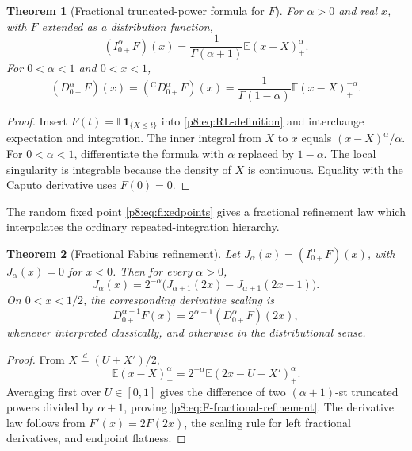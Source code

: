 \documentclass[11pt,oneside]{article}
\newtheorem{theorem}{Theorem}[section]
\theoremstyle{definition}
\theoremstyle{remark}
\newcommand{\E}{\mathbb E}
\newcommand{\1}{\mathbf 1}
\begin{document}
\begin{theorem}[Fractional truncated-power formula for \(F\)]
\label{p8:thm:F-fractional}
For \(\alpha>0\) and real \(x\), with \(F\) extended as a distribution
function,
\begin{equation}
 \boxed{
 (I_{0+}^{\alpha}F)(x)
 =\frac1{\Gamma(\alpha+1)}\E(x-X)_+^{\alpha}.}
 \label{p8:eq:F-fractional-integral}
\end{equation}
For \(0<\alpha<1\) and \(0<x<1\),
\begin{equation}
 \boxed{
 (D_{0+}^{\alpha}F)(x)
 =({}^{\mathrm C}D_{0+}^{\alpha}F)(x)
 =\frac1{\Gamma(1-\alpha)}\E(x-X)_+^{-\alpha}.}
 \label{p8:eq:F-fractional-derivative}
\end{equation}
\statusprovedPartll
\end{theorem}

\begin{proof}
Insert \(F(t)=\E\mathbf1_{\{X\le t\}}\) into \eqref{p8:eq:RL-definition} and
interchange expectation and integration.  The inner integral from \(X\) to
\(x\) equals \((x-X)^\alpha/\alpha\).  For \(0<\alpha<1\), differentiate the
formula with \(\alpha\) replaced by \(1-\alpha\).  The local singularity is
integrable because the density of \(X\) is continuous.  Equality with the
Caputo derivative uses \(F(0)=0\).
\end{proof}

The random fixed point \eqref{p8:eq:fixedpoints} gives a fractional refinement law
which interpolates the ordinary repeated-integration hierarchy.

\begin{theorem}[Fractional Fabius refinement]
\label{p8:thm:F-fractional-refinement}
Let \(J_\alpha(x)=(I_{0+}^{\alpha}F)(x)\), with \(J_\alpha(x)=0\) for
\(x<0\).  Then for every \(\alpha>0\),
\begin{equation}
 \boxed{
 J_\alpha(x)=2^{-\alpha}
 \bigl(J_{\alpha+1}(2x)-J_{\alpha+1}(2x-1)\bigr).}
 \label{p8:eq:F-fractional-refinement}
\end{equation}
On \(0<x<1/2\), the corresponding derivative scaling is
\begin{equation}
 D_{0+}^{\alpha+1}F(x)
 =2^{\alpha+1}(D_{0+}^{\alpha}F)(2x),
 \label{p8:eq:F-fractional-derivative-scaling}
\end{equation}
whenever interpreted classically, and otherwise in the distributional sense.
\statusprovedPartll
\end{theorem}

\begin{proof}
From \(X\stackrel d=(U+X')/2\),
\[
 \E(x-X)_+^\alpha
 =2^{-\alpha}\E(2x-U-X')_+^\alpha.
\]
Averaging first over \(U\in[0,1]\) gives the difference of two
\((\alpha+1)\)-st truncated powers divided by \(\alpha+1\), proving
\eqref{p8:eq:F-fractional-refinement}.  The derivative law follows from
\(F'(x)=2F(2x)\), the scaling rule for left fractional derivatives, and endpoint
flatness.
\end{proof}
\end{document}

